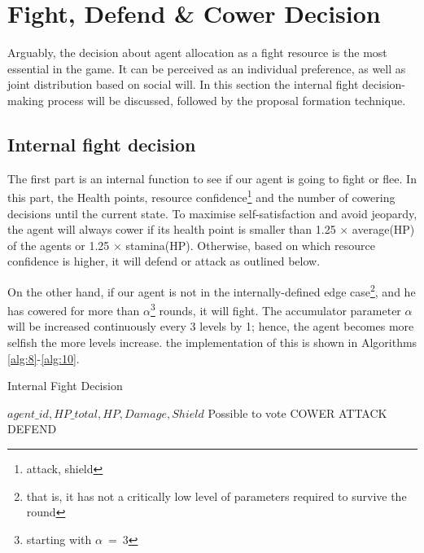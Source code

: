 \section{Fight, Defend \& Cower Decision}


Arguably, the decision about agent allocation as a fight resource is the most essential in the game. It can be perceived as an individual preference, as well as joint distribution based on social will. In this section the internal fight decision-making process will be discussed, followed by the proposal formation technique.


    \subsection{Internal fight decision}

        The first part is an internal function to see if our agent is going to fight or flee. In this part, the Health points, resource confidence\footnote{attack, shield} and the number of cowering decisions until the current state.
        To maximise self-satisfaction and avoid jeopardy, the agent will always cower if its health point is smaller  than  1.25 $\times$ average(HP) of the agents or 1.25 $\times$ stamina(HP). Otherwise, based on which resource confidence is higher, it will defend or attack as outlined below.

        On the other hand, if our agent is not in the internally-defined edge case\footnote{that is, it has not a critically low level of parameters required to survive the round}, and he has cowered for more than $\alpha$\footnote{starting with $\alpha~=~3$} rounds, it will fight. The accumulator parameter $\alpha$ will be increased continuously every 3 levels by 1; hence, the agent becomes more selfish the more levels increase. the implementation of this is shown in Algorithms \ref{alg:8}-\ref{alg:10}. 


\begin{algorithm}[htb]
\caption{Internal Fight Decision}\label{alg:8}
\begin{algorithmic} 
\scriptsize
\Require $agent\_id, HP\_total, HP, Damage, Shield$
\Ensure Possible to vote
\Return COWER
\EndIf
\Return ATTACK
\EndIf
{}
\Return DEFEND
\EndIf
\end{algorithmic}
\end{algorithm}

